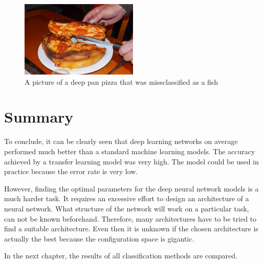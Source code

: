 \begin{figure}[h]
\centering
\includegraphics[width=0.5\textwidth]{Figures/4/4.jpg}
\caption{A picture of a deep pan pizza that was missclassified as a fish}
\label{fig:miss}
\end{figure}




\section{Summary}

To conclude, it can be clearly seen that deep learning networks on average performed much better than a standard machine learning models. The accuracy achieved by a transfer learning model was very high. The model could be used in practice because the error rate is very low.

However, finding the optimal parameters for the deep neural network models is a much harder task. It requires an excessive effort to design an architecture of a neural network. What structure of the network will work on a particular task,  can not be known beforehand. Therefore, many architectures have to be tried to find a suitable architecture. Even then it is unknown if the chosen architecture is actually the best because the configuration space is gigantic.

In the next chapter, the results of all classification methods are compared.